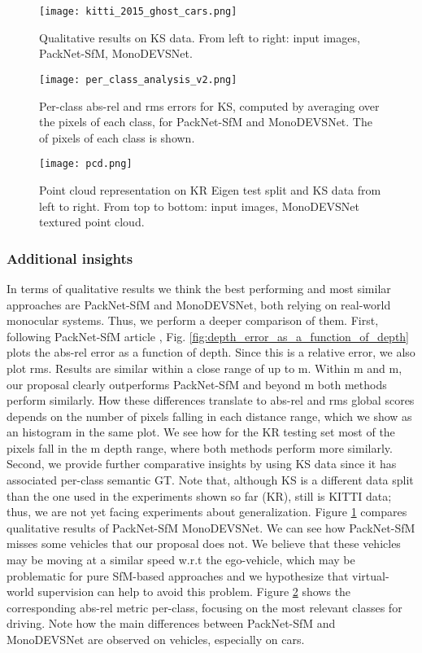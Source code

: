 \documentclass[journal]{IEEEtran}
\newcommand{\Fig}[1]{Fig. \ref{fig:#1}}
\begin{document}
\begin{figure}
    \centering
    \texttt{[image: kitti\_2015\_ghost\_cars.png]}
    \caption{Qualitative results on KS data. From left to right: input images, PackNet-SfM, MonoDEVSNet.}
    \label{fig:kitti_2015_ghost_cars_qualitative}
\end{figure}

\begin{figure}
    \centering
    \texttt{[image: per\_class\_analysis\_v2.png]}
    \caption{Per-class abs-rel and rms errors for KS, computed by averaging over the pixels of each class, for PackNet-SfM and MonoDEVSNet. The  of pixels of each class is shown.}
    \label{fig:per_class_analysis}
\end{figure}


\begin{figure}
    \centering
    \texttt{[image: pcd.png]}
    \caption{Point cloud representation on KR Eigen test split \cite{Eigen:2014} and KS data from left to right. From top to bottom: input images, MonoDEVSNet textured point cloud.}
    \label{fig:pcd_representation}
\end{figure}

\subsubsection{Additional insights}
In terms of qualitative results we think the best performing and most similar approaches are PackNet-SfM and MonoDEVSNet, both relying on real-world monocular systems. Thus, we perform a deeper comparison of them. First, following PackNet-SfM article \cite{Guizilini:20203D}, \Fig{depth_error_as_a_function_of_depth} plots the abs-rel error as a function of depth. Since this is a relative error, we also plot rms. Results are similar within a close range of up to m. Within m and m, our proposal clearly outperforms PackNet-SfM and beyond m both methods perform similarly. How these differences translate to abs-rel and rms global scores depends on the number of pixels falling in each distance range, which we show as an histogram in the same plot. We see how for the KR testing set most of the pixels fall in the m depth range, where both methods perform more similarly. Second, we provide further comparative insights by using KS data since it has associated per-class semantic GT. Note that, although KS is a different data split than the one used in the experiments shown so far (KR), still is KITTI data; thus, we are not yet facing experiments about generalization. Figure \ref{fig:kitti_2015_ghost_cars_qualitative} compares qualitative results of PackNet-SfM {\vs} MonoDEVSNet. We can see how PackNet-SfM misses some vehicles that our proposal does not. We believe that these vehicles may be moving at a similar speed w.r.t the ego-vehicle, which may be problematic for pure SfM-based approaches and we hypothesize that virtual-world supervision can help to avoid this problem. Figure \ref{fig:per_class_analysis} shows the corresponding abs-rel metric per-class, focusing on the most relevant classes for driving. Note how the main differences between PackNet-SfM and MonoDEVSNet are observed on vehicles, especially on cars. 
\end{document}
